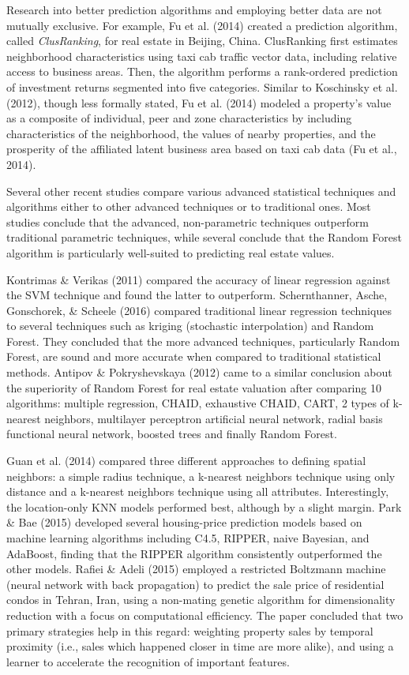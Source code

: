 \documentclass[12pt,]{article}
\begin{document}
Research into better prediction algorithms and employing better data are
not mutually exclusive. For example, Fu et al. (2014) created a
prediction algorithm, called \emph{ClusRanking}, for real estate in
Beijing, China. ClusRanking first estimates neighborhood characteristics
using taxi cab traffic vector data, including relative access to
business areas. Then, the algorithm performs a rank-ordered prediction
of investment returns segmented into five categories. Similar to
Koschinsky et al. (2012), though less formally stated, Fu et al. (2014)
modeled a property's value as a composite of individual, peer and zone
characteristics by including characteristics of the neighborhood, the
values of nearby properties, and the prosperity of the affiliated latent
business area based on taxi cab data (Fu et al., 2014).

Several other recent studies compare various advanced statistical
techniques and algorithms either to other advanced techniques or to
traditional ones. Most studies conclude that the advanced,
non-parametric techniques outperform traditional parametric techniques,
while several conclude that the Random Forest algorithm is particularly
well-suited to predicting real estate values.

Kontrimas \& Verikas (2011) compared the accuracy of linear regression
against the SVM technique and found the latter to outperform.
Schernthanner, Asche, Gonschorek, \& Scheele (2016) compared traditional
linear regression techniques to several techniques such as kriging
(stochastic interpolation) and Random Forest. They concluded that the
more advanced techniques, particularly Random Forest, are sound and more
accurate when compared to traditional statistical methods. Antipov \&
Pokryshevskaya (2012) came to a similar conclusion about the superiority
of Random Forest for real estate valuation after comparing 10
algorithms: multiple regression, CHAID, exhaustive CHAID, CART, 2 types
of k-nearest neighbors, multilayer perceptron artificial neural network,
radial basis functional neural network, boosted trees and finally Random
Forest.

Guan et al. (2014) compared three different approaches to defining
spatial neighbors: a simple radius technique, a k-nearest neighbors
technique using only distance and a k-nearest neighbors technique using
all attributes. Interestingly, the location-only KNN models performed
best, although by a slight margin. Park \& Bae (2015) developed several
housing-price prediction models based on machine learning algorithms
including C4.5, RIPPER, naive Bayesian, and AdaBoost, finding that the
RIPPER algorithm consistently outperformed the other models. Rafiei \&
Adeli (2015) employed a restricted Boltzmann machine (neural network
with back propagation) to predict the sale price of residential condos
in Tehran, Iran, using a non-mating genetic algorithm for dimensionality
reduction with a focus on computational efficiency. The paper concluded
that two primary strategies help in this regard: weighting property
sales by temporal proximity (i.e., sales which happened closer in time
are more alike), and using a learner to accelerate the recognition of
important features.
\end{document}
